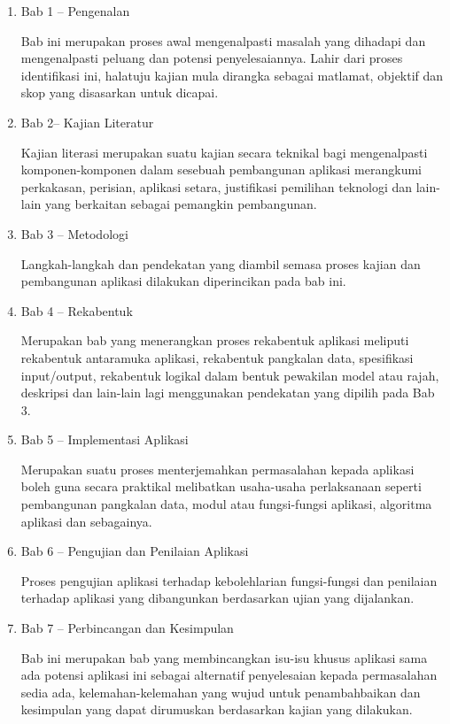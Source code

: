 \begin{enumerate}
\item Bab 1 – Pengenalan

Bab ini merupakan proses awal mengenalpasti masalah yang dihadapi dan mengenalpasti peluang dan potensi penyelesaiannya. Lahir dari proses identifikasi ini, halatuju kajian mula dirangka sebagai matlamat, objektif dan skop yang disasarkan untuk dicapai.

\item Bab 2– Kajian Literatur

Kajian literasi merupakan suatu kajian secara teknikal bagi mengenalpasti komponen-komponen dalam sesebuah pembangunan aplikasi merangkumi perkakasan, perisian, aplikasi setara, justifikasi pemilihan teknologi dan lain-lain yang berkaitan sebagai pemangkin pembangunan.

\item Bab 3 – Metodologi

Langkah-langkah dan pendekatan yang diambil semasa proses kajian dan pembangunan aplikasi dilakukan diperincikan pada bab ini.

\item Bab 4 – Rekabentuk

Merupakan bab yang menerangkan proses rekabentuk aplikasi meliputi rekabentuk antaramuka aplikasi, rekabentuk pangkalan data, spesifikasi input/output, rekabentuk logikal dalam bentuk pewakilan model atau rajah, deskripsi dan lain-lain lagi menggunakan pendekatan yang dipilih pada Bab 3.

\item Bab 5 –  Implementasi Aplikasi

Merupakan suatu proses menterjemahkan permasalahan kepada aplikasi boleh guna secara praktikal melibatkan usaha-usaha perlaksanaan seperti pembangunan pangkalan data, modul atau fungsi-fungsi aplikasi, algoritma aplikasi dan sebagainya.

\item Bab 6 – Pengujian dan Penilaian Aplikasi

Proses pengujian aplikasi terhadap kebolehlarian fungsi-fungsi dan penilaian terhadap aplikasi yang dibangunkan berdasarkan ujian yang dijalankan.

\item Bab 7 – Perbincangan dan Kesimpulan

Bab ini merupakan bab yang membincangkan isu-isu khusus aplikasi sama ada potensi aplikasi ini sebagai alternatif penyelesaian kepada permasalahan sedia ada, kelemahan-kelemahan yang wujud untuk penambahbaikan dan kesimpulan yang dapat dirumuskan berdasarkan kajian yang dilakukan.
\end{enumerate}
\egroup
